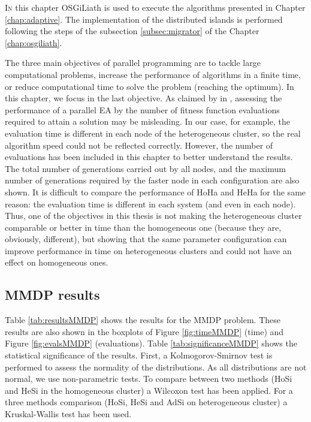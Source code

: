 \label{chap:adaptiveresults}
\minitoc\mtcskip
\vfill
\lettrine{I}{n} this chapter OSGiLiath is used to execute the algorithms presented in Chapter \ref{chap:adaptive}. The implementation of the distributed islands is performed following the steps of the subsection \ref{subsec:migrator} of the Chapter \ref{chap:osgiliath}.

The three main objectives of parallel programming are to tackle large computational problems, increase the performance of algorithms in a finite time, or reduce computational time to solve the problem (reaching the optimum). In this chapter, we focus in the last objective.
As claimed by  in \cite{Alba06evaluationParallel}, assessing the performance of a parallel EA by the number of fitness function evaluations required to attain a solution may be misleading. In our case, for example, the evaluation time is different in each node of the heterogeneous cluster, so the real algorithm speed could not be reflected correctly. However, the number of evaluations has been included in this chapter to better understand the results. The total number of generations carried out by all nodes, and the maximum number of generations required by the faster node in each configuration are also shown. It is difficult to compare the performance of HoHa and HeHa for the same reason: the evaluation time is different in each system (and even in each node). Thus, one of the objectives in this thesis is not making the heterogeneous cluster comparable or better in time than the homogeneous one (because they are, obviously, different), but showing that the same parameter configuration can improve performance in time on heterogeneous clusters and could not have an effect on homogeneous ones.


\subsection{MMDP results}

Table \ref{tab:resultsMMDP} shows the results for the MMDP problem. These results are also shown in the boxplots of Figure \ref{fig:timeMMDP} (time) and Figure \ref{fig:evalsMMDP} (evaluations). Table \ref{tab:significanceMMDP} shows the statistical significance of the results. First, a Kolmogorov-Smirnov test is performed to assess the normality of the distributions. As all distributions are not normal, we use non-parametric tests. To compare between two methods (HoSi and HeSi in the homogeneous cluster) a Wilcoxon test has been applied. For a three methods comparison (HoSi, HeSi and AdSi on heterogeneous cluster) a Kruskal-Wallis test has been used. 


